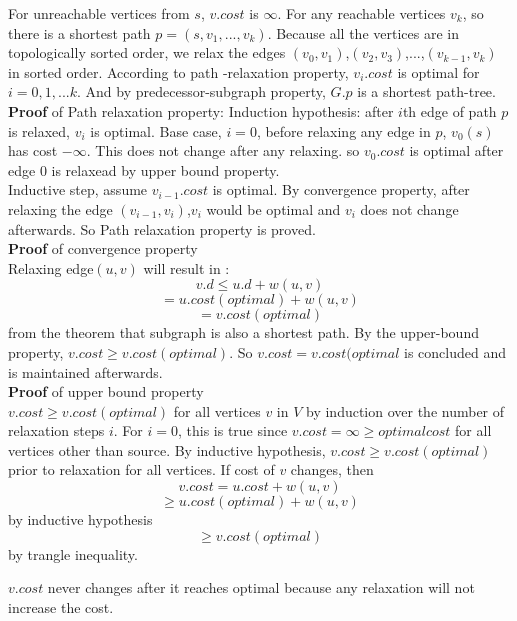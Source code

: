 \documentclass[11pt]{article}
\begin{document}
\begin{enumerate}
\begin{enumerate}
For unreachable vertices from $s$, $v.cost$ is $\infty$. For any reachable vertices $v_k$, so there is a shortest path $p = (s,v_1,...,v_k)$. Because all the vertices are in topologically sorted order, we relax the edges $(v_0,v_1)$,$(v_2,v_3)$,...,$(v_{k-1},v_k)$ in sorted order. According to path -relaxation property, $v_i.cost$ is optimal for $i=0,1,...k$. And by predecessor-subgraph property, $G.p$ is a shortest path-tree.
\\
\textbf{Proof} of Path relaxation property:
Induction hypothesis: after $i$th edge of path $p$ is relaxed, $v_i$ is optimal. Base case, $i=0$, before relaxing any edge in $p$, $v_0(s)$ has cost $-\infty$. This does not change after any relaxing. so $v_0.cost$ is optimal after edge 0 is relaxead by upper bound property.\\
Inductive step, assume $v_{i-1}.cost$ is optimal. By convergence property, after relaxing the edge $(v_{i-1},v_i)$,$v_i$ would be optimal and $v_i$ does not change afterwards. So Path relaxation property is proved. 
\\
\textbf{Proof} of convergence property\\
Relaxing edge$(u,v)$ will result in :\\
\[v.d \leq u.d + w(u,v)\]
\[ = u.cost(optimal) + w(u,v)\] 
\[ = v.cost(optimal)\] from the theorem that subgraph is also a shortest path. 
By the upper-bound property, $v.cost \geq v.cost(optimal)$. So $v.cost = v.cost(optimal$ is concluded and is maintained afterwards.
\\
\textbf{Proof} of upper bound property\\
$v.cost \geq v.cost(optimal)$ for all vertices $v$ in $V$ by induction over the number of relaxation steps $i$. For $i=0$, this is true since $v.cost = \infty \geq optimal cost$ for all vertices other than source. By inductive hypothesis, $v.cost \geq v.cost(optimal)$ prior to relaxation for all vertices.
If cost of $v$ changes, then
\[ v.cost = u.cost + w(u,v)\]
\[ \geq u.cost(optimal) + w(u,v)\] by inductive hypothesis
\[ \geq v.cost(optimal)\] by trangle inequality.

$v.cost$ never changes after it reaches optimal because any relaxation will not increase the cost. 






\end{enumerate}


\end{enumerate}
\end{document}
